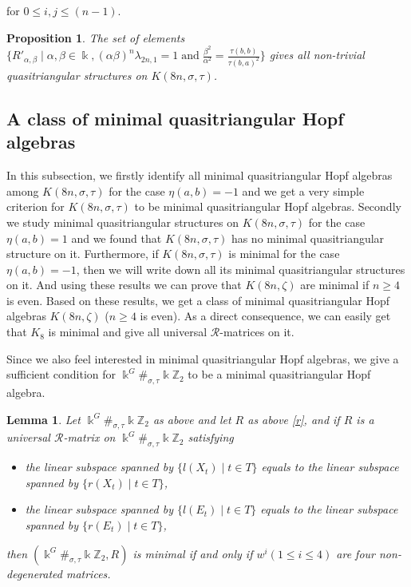 \documentclass[a4paper,11pt]{amsart}
\numberwithin{equation}{section}
\newtheorem{lemma}[theorem]{Lemma}
\newtheorem{proposition}[theorem]{Proposition}
\begin{document}
for $0\leq i,j \leq (n-1)$.
\begin{proposition}\label{propo4.4}  The set of elements $\{R'_{\alpha,\beta}\;|\;\alpha,\beta \in \Bbbk ,(\alpha\beta)^n\lambda_{2n,1}=1\; \text{and}\; \frac{\beta^2}{\alpha^2}=\frac{\tau(b,b)}{\tau(b,a)^2}\}$ gives all non-trivial quasitriangular structures on $K(8n,\sigma,\tau)$.
\end{proposition}

\subsection{A class of minimal quasitriangular Hopf algebras}
In this subsection, we firstly identify all minimal quasitriangular Hopf algebras among $K(8n,\sigma,\tau)$ for the case $\eta(a,b)=-1$ and we get a very simple criterion for $K(8n,\sigma,\tau)$ to be minimal quasitriangular Hopf algebras. Secondly we study minimal quasitriangular structures on $K(8n,\sigma,\tau)$ for the case $\eta(a,b)=1$ and we found that $K(8n,\sigma,\tau)$ has no minimal quasitriangular structure on it. Furthermore, if $K(8n,\sigma,\tau)$ is minimal for the case $\eta(a,b)=-1$, then we will write down all its minimal quasitriangular structures on it. And using these results we can prove that $K(8n,\zeta)$ are minimal if $n\geq 4$ is even. Based on these results, we get a class of minimal quasitriangular Hopf algebras $K(8n,\zeta)$ ($n\geq 4$ is even). As a direct consequence, we can easily get that $K_8$ is minimal and give all universal $\mathcal{R}$-matrices on it.

Since we also feel interested in minimal quasitriangular Hopf algebras, we give a sufficient condition for $\Bbbk^G\#_{\sigma,\tau}\Bbbk \mathbb{Z}_{2}$ to be a minimal quasitriangular Hopf algebra.
\begin{lemma}\label{lem3.3}
Let $\Bbbk^G\#_{\sigma,\tau}\Bbbk \mathbb{Z}_{2}$ as above and let $R$ as above \ref{r}, and if $R$ is a universal $\mathcal{R}$-matrix on $\Bbbk^G\#_{\sigma,\tau}\Bbbk \mathbb{Z}_{2}$ satisfying
\begin{itemize}
  \item[(i)] the linear subspace spanned by $\{l(X_t)\;|\;t \in T\}$ equals to the linear subspace spanned by $\{r(X_t)\;|\;t \in T\}$,
  \item[(ii)] the linear subspace spanned by $\{l(E_t)\;|\;t \in T\}$ equals to the linear subspace spanned by $\{r(E_t)\;|\;t \in T\}$,
\end{itemize}
 then $(\Bbbk^G\#_{\sigma,\tau}\Bbbk \mathbb{Z}_{2},R)$ is minimal if and only if $w^i(1\leq i\leq 4)$ are four non-degenerated matrices.
\end{lemma}
\end{document}
